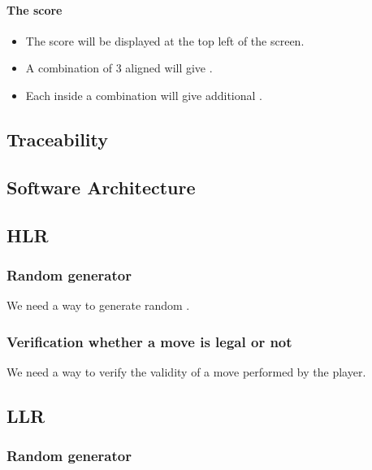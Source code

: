 \paragraph{The score}

\begin{itemize}
\item The score will be displayed at the top left of the screen.
\item A combination of 3 aligned \sqs will give \threepts \pts.
\item Each \sq inside a combination will give \sqpts additional \pts.
\end{itemize}

\subsection{Traceability}

\subsection{Software Architecture}

\subsection{HLR}

\subsubsection{Random \sq generator}

We need a way to generate random \sqs.

\subsubsection{Verification whether a move is legal or not}

We need a way to verify the validity of a move performed by the player.

\subsection{LLR}

\subsubsection{Random \sq generator}




